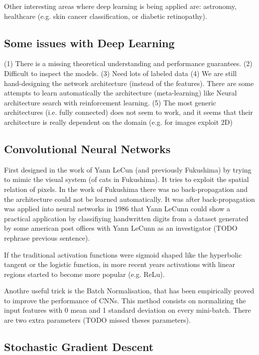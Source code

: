 \documentclass[b5paper]{report}
\begin{document}
Other interesting areas where deep learning is being applied are: astronomy,
healthcare (e.g. skin cancer classification, or diabetic retinopathy).

\subsection{Some issues with Deep Learning}

(1) There is a missing theoretical understanding and performance guarantees.
(2) Difficult to inspect the models.
(3) Need lots of labeled data
(4) We are still hand-designing the network architecture (instead of the features).
There are some attempts to learn automatically the architecture (meta-learning)
like Neural architecture search with reinforcement learning.
(5) The most generic architectures (i.e. fully connected) does not seem to
work, and it seems that their architecture is really dependent on the domain
(e.g. for images exploit 2D)

\subsection{Convolutional Neural Networks}

First designed in the work of Yann LeCun (and previously Fukushima) by trying to
mimic the visual system (of cats in Fukushima). It tries to exploit the spatial
relation of pixels. In the work of Fukushima there was no back-propagation and
the architecture could not be learned automatically. It was after
back-propagation was applied into neural networks in 1986 that Yann LeCunn
could show a practical application by classifiying handwritten digits from a
dataset generated by some american post offices with Yann LeCunn as an
investigator (TODO rephrase previous sentence).

If the traditional activation functions were sigmoid shaped like the hyperbolic
tangent or the logistic function, in more recent years activations with linear
regions started to become more popular (e.g. ReLu).

Anothre useful trick is the Batch Normalisation, that has been empirically
proved to improve the performance of CNNs. This method consists on normalizing
the input features with 0 mean and 1 standard deviation on every mini-batch.
There are two extra parameters (TODO missed theses parameters).

\subsection{Stochastic Gradient Descent}
\end{document}

